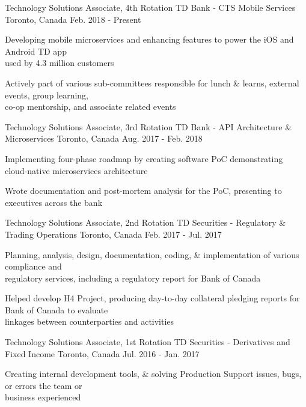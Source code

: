 \begin{cventries}
   \cventry
     {Technology Solutions Associate, 4th Rotation}
     {TD Bank - CTS Mobile Services}
     {Toronto, Canada}
     {Feb. 2018 - Present}
     {
      \begin{cvitems}
       \item {Developing mobile microservices and enhancing features to power the iOS and Android TD app \\used by
       4.3 million customers}
       \item {Actively part of various sub-committees responsible for lunch \& learns, external events, group learning, \\ co-op mentorship, and associate related events}
      \end{cvitems}
      }
	\cventry
     {Technology Solutions Associate, 3rd Rotation}
     {TD Bank - API Architecture \& Microservices}
     {Toronto, Canada}
     {Aug. 2017 - Feb. 2018}
     {
      \begin{cvitems}
       \item {Implementing four-phase roadmap by creating software PoC demonstrating cloud-native microservices architecture}
       \item {Wrote documentation and post-mortem analysis for the PoC, presenting to executives across the bank}
      \end{cvitems}
      }
   \cventry
    {Technology Solutions Associate, 2nd Rotation}
    {TD Securities - Regulatory \& Trading Operations}
    {Toronto, Canada}
    {Feb. 2017 - Jul. 2017}
    {
      \begin{cvitems}
        \item {Planning, analysis, design, documentation, coding, \& implementation of various compliance and \\regulatory services, including a regulatory report for Bank of Canada}
        \item {Helped develop H4 Project, producing day-to-day collateral pledging reports for Bank of Canada to evaluate \\linkages between counterparties and activities}
      \end{cvitems}
    }
  \cventry
    {Technology Solutions Associate, 1st Rotation}
    {TD Securities - Derivatives and Fixed Income}
    {Toronto, Canada}
    {Jul. 2016 - Jan. 2017}
    {
      \begin{cvitems}
        \item {Creating internal development tools, \& solving Production Support issues, bugs, or errors the team or \\business experienced}

\end{cvitems}}
\end{cventries}
